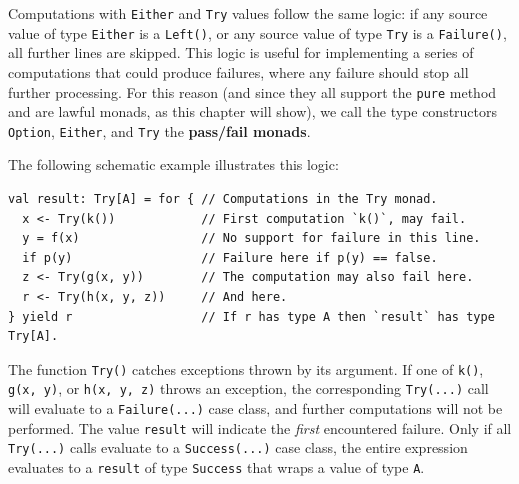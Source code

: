 Computations with \lstinline!Either! and \lstinline!Try! values
follow the same logic: if any source value of type \lstinline!Either!
is a \lstinline!Left()!, or any source value of type \lstinline!Try!
is a \lstinline!Failure()!, all further lines are skipped. This logic
is useful for implementing a series of computations that could produce
failures, where any failure should stop all further processing. For
this reason (and since they all support the \lstinline!pure! method
and are lawful monads, as this chapter will show), we call the type
constructors \lstinline!Option!, \lstinline!Either!, and \lstinline!Try!
the \textbf{pass/fail monads}. 

The following schematic example illustrates this logic:
\begin{lstlisting}
val result: Try[A] = for { // Computations in the Try monad.
  x <- Try(k())            // First computation `k()`, may fail.
  y = f(x)                 // No support for failure in this line.
  if p(y)                  // Failure here if p(y) == false.
  z <- Try(g(x, y))        // The computation may also fail here.
  r <- Try(h(x, y, z))     // And here.
} yield r                  // If r has type A then `result` has type Try[A].
\end{lstlisting}
The function \lstinline!Try()! catches exceptions thrown by its argument.
If one of \lstinline!k()!, \lstinline!g(x, y)!, or \lstinline!h(x, y, z)!
throws an exception, the corresponding \lstinline!Try(...)! call
will evaluate to a \lstinline!Failure(...)! case class, and further
computations will not be performed. The value \lstinline!result!
will indicate the \emph{first} encountered failure. Only if all \lstinline!Try(...)!
calls evaluate to a \lstinline!Success(...)! case class, the entire
expression evaluates to a \lstinline!result! of type \lstinline!Success!
that wraps a value of type \lstinline!A!.

